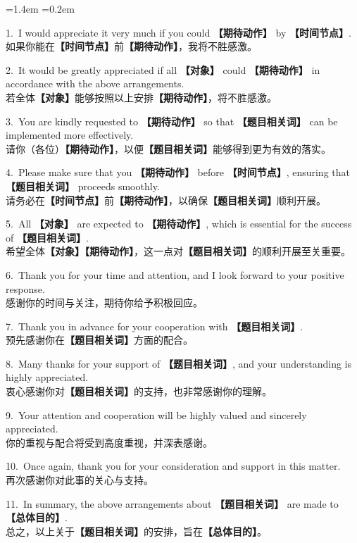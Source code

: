 \documentclass[11pt,a4paper]{ctexart}
\newcommand{\fillin}[1]{{\bfseries【#1】}}
\newenvironment{eg}{%
  \par\addvspace{4pt}%
  \begin{list}{}{\leftmargin=1.4em \rightmargin=0.2em \listparindent=0pt
    \itemindent=0pt \topsep=0pt \parsep=2pt \itemsep=2pt \partopsep=0pt}%
  \item\relax
}{%
  \end{list}\addvspace{5pt}%
}
\begin{document}
\begin{eg}
1.\ I would appreciate it very much if you could \fillin{期待动作} by \fillin{时间节点}.\\
如果你能在\fillin{时间节点}前\fillin{期待动作}，我将不胜感激。

2.\ It would be greatly appreciated if all \fillin{对象} could \fillin{期待动作} in accordance with the above arrangements.\\
若全体\fillin{对象}能够按照以上安排\fillin{期待动作}，将不胜感激。

3.\ You are kindly requested to \fillin{期待动作} so that \fillin{题目相关词} can be implemented more effectively.\\
请你（各位）\fillin{期待动作}，以便\fillin{题目相关词}能够得到更为有效的落实。

4.\ Please make sure that you \fillin{期待动作} before \fillin{时间节点}, ensuring that \fillin{题目相关词} proceeds smoothly.\\
请务必在\fillin{时间节点}前\fillin{期待动作}，以确保\fillin{题目相关词}顺利开展。

5.\ All \fillin{对象} are expected to \fillin{期待动作}, which is essential for the success of \fillin{题目相关词}.\\
希望全体\fillin{对象}\fillin{期待动作}，这一点对\fillin{题目相关词}的顺利开展至关重要。

6.\ Thank you for your time and attention, and I look forward to your positive response.\\
感谢你的时间与关注，期待你给予积极回应。

7.\ Thank you in advance for your cooperation with \fillin{题目相关词}.\\
预先感谢你在\fillin{题目相关词}方面的配合。

8.\ Many thanks for your support of \fillin{题目相关词}, and your understanding is highly appreciated.\\
衷心感谢你对\fillin{题目相关词}的支持，也非常感谢你的理解。

9.\ Your attention and cooperation will be highly valued and sincerely appreciated.\\
你的重视与配合将受到高度重视，并深表感谢。

10.\ Once again, thank you for your consideration and support in this matter.\\
再次感谢你对此事的关心与支持。

11.\ In summary, the above arrangements about \fillin{题目相关词} are made to \fillin{总体目的}.\\
总之，以上关于\fillin{题目相关词}的安排，旨在\fillin{总体目的}。


\end{eg}
\end{document}
